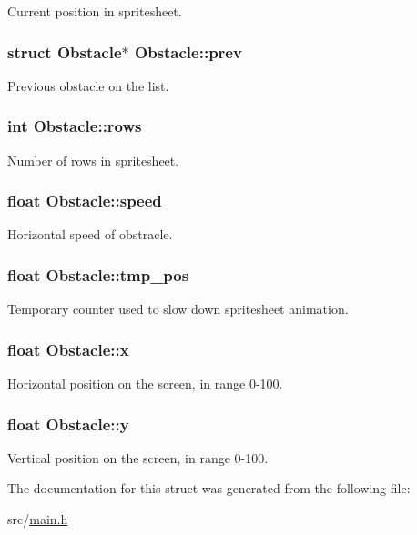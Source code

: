 \-Current position in spritesheet. \hypertarget{structObstacle_a13bc07b730f58d5b1c3db68e8e4aca27}{
\subsubsection[{prev}]{\setlength{\rightskip}{0pt plus 5cm}struct {\bf \-Obstacle}$\ast$ {\bf \-Obstacle\-::prev}}}\label{structObstacle_a13bc07b730f58d5b1c3db68e8e4aca27}
\-Previous obstacle on the list. \hypertarget{structObstacle_aab33c9d4c0f05d02fda4e77cff7d7e72}{
\subsubsection[{rows}]{\setlength{\rightskip}{0pt plus 5cm}int {\bf \-Obstacle\-::rows}}}\label{structObstacle_aab33c9d4c0f05d02fda4e77cff7d7e72}
\-Number of rows in spritesheet. \hypertarget{structObstacle_a1e2b46db05325273ce0fcba3550b5b2a}{
\subsubsection[{speed}]{\setlength{\rightskip}{0pt plus 5cm}float {\bf \-Obstacle\-::speed}}}\label{structObstacle_a1e2b46db05325273ce0fcba3550b5b2a}
\-Horizontal speed of obstracle. \hypertarget{structObstacle_afd620c4c3496cd6f84184dcda4ca7611}{
\subsubsection[{tmp\-\_\-pos}]{\setlength{\rightskip}{0pt plus 5cm}float {\bf \-Obstacle\-::tmp\-\_\-pos}}}\label{structObstacle_afd620c4c3496cd6f84184dcda4ca7611}
\-Temporary counter used to slow down spritesheet animation. \hypertarget{structObstacle_ad9cd25e0032f6692a4f93a057ccdfd85}{
\subsubsection[{x}]{\setlength{\rightskip}{0pt plus 5cm}float {\bf \-Obstacle\-::x}}}\label{structObstacle_ad9cd25e0032f6692a4f93a057ccdfd85}
\-Horizontal position on the screen, in range 0-\/100. \hypertarget{structObstacle_af4b6f012014e2fa5aef193330f70fdef}{
\subsubsection[{y}]{\setlength{\rightskip}{0pt plus 5cm}float {\bf \-Obstacle\-::y}}}\label{structObstacle_af4b6f012014e2fa5aef193330f70fdef}
\-Vertical position on the screen, in range 0-\/100. 

\-The documentation for this struct was generated from the following file\-:\begin{DoxyCompactItemize}
\item 
src/\hyperlink{main_8h}{main.\-h}\end{DoxyCompactItemize}

